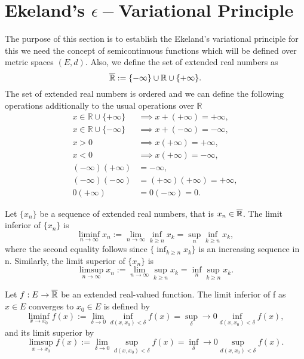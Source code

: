 
\section{Ekeland's $\epsilon -$Variational Principle} 

    The purpose of this section is to establish the Ekeland's variational 
    principle {\cite{guler2010foundations}} for this we need the concept of 
    semicontinuous functions which will be defined over metric spaces $(E,d)$. 
    Also, we  define the set of extended real numbers as
    $$
        \overline{\mathbb{R}} := \{- \infty \} \cup \mathbb{R} \cup \{ + \infty \}.
    $$
    The set of extended real numbers is ordered and we can define the following 
    operations additionally to the usual operations over $\mathbb{R}$
    \begin{align*}
        x \in \mathbb{R} \cup \{+\infty\} &\implies x + (+ \infty) = +\infty, \\
        x \in \mathbb{R} \cup \{-\infty\} &\implies x + (- \infty) = -\infty, \\
        x > 0 &\implies x(+ \infty) = + \infty, \\
        x < 0 &\implies x(+ \infty) = - \infty, \\
        (- \infty)(+ \infty) &= -\infty, \\
        (- \infty)(- \infty) &= (+ \infty)(+ \infty) = + \infty, \\
        0(+ \infty) &= 0(-\infty) = 0.
    \end{align*}


    \begin{definition}
        Let $\{ x_n \}$ be a sequence of extended real numbers, that is 
        $x_n \in \overline{\mathbb{R}}$. The limit inferior of $\{ x_n \}$ is
        $$
            \liminf_{n \to \infty} x_n := \lim_{n \to \infty} \inf_{k \geq n}{x_{k}} %
            = \sup_{n} \inf_{k \geq n}{x_k},
        $$
        where the second equality follows since $\{ \inf_{k \geq n}{x_k} \}$ 
        is an increasing sequence in n. Similarly, the limit superior of 
        $\{ x_n \}$ is
        $$
            \limsup_{n \to \infty} x_n := \lim_{n \to \infty} \sup_{k \geq n}{x_{k}} %
            = \inf_{n} \sup_{k \geq n}{x_k}.
        $$
    \end{definition}
    
    \begin{definition}
        Let $f : E \to \overline{\mathbb{R}} $ be an extended real-valued function. The limit
        inferior of f as $x \in E$ converges to $x_0 \in E$  is defined by 
        $$
            \liminf_{x \to x_0} f(x) := \lim_{\delta \to 0} %
            \inf_{d(x, x_0) < \delta} f(x) = \sup_{\delta} \to 0 \inf_{d(x, x_0) < \delta} f(x),
        $$
        and its limit superior by 
        $$
            \limsup_{x \to x_0} f(x) := \lim_{\delta \to 0} %
            \sup_{d(x, x_0) < \delta} f(x) = \inf_{\delta} \to 0 \sup_{d(x, x_0) < \delta} f(x).
        $$
    \end{definition}
    
